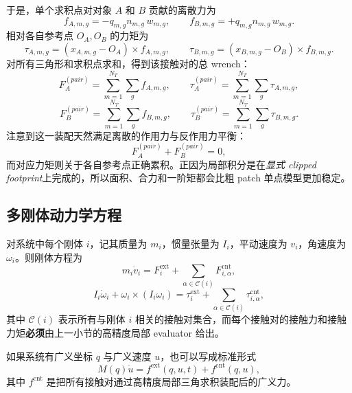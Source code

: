 \documentclass[12pt,a4paper]{ctexart}
\begin{document}
于是，单个求积点对对象 $A$ 和 $B$ 贡献的离散力为
\begin{equation}
    f_{A,m,g} = - q_{m,g} n_{m,g} \, w_{m,g},
    \qquad
    f_{B,m,g} = + q_{m,g} n_{m,g} \, w_{m,g}.
\end{equation}
相对各自参考点 $O_A,O_B$ 的力矩为
\begin{equation}
    \tau_{A,m,g} = (x_{A,m,g}-O_A)\times f_{A,m,g},
    \qquad
    \tau_{B,m,g} = (x_{B,m,g}-O_B)\times f_{B,m,g}.
\end{equation}
对所有三角形和求积点求和，得到该接触对的总 wrench：
\begin{equation}
    F_A^{(pair)} = \sum_{m=1}^{N_T}\sum_g f_{A,m,g},
    \qquad
    \tau_A^{(pair)} = \sum_{m=1}^{N_T}\sum_g \tau_{A,m,g},
\end{equation}
\begin{equation}
    F_B^{(pair)} = \sum_{m=1}^{N_T}\sum_g f_{B,m,g},
    \qquad
    \tau_B^{(pair)} = \sum_{m=1}^{N_T}\sum_g \tau_{B,m,g}.
\end{equation}
注意到这一装配天然满足离散的作用力与反作用力平衡：
\begin{equation}
    F_A^{(pair)} + F_B^{(pair)} = 0,
\end{equation}
而对应力矩则关于各自参考点正确累积。正因为局部积分是在\emph{显式 clipped footprint}上完成的，所以面积、合力和一阶矩都会比粗 patch 单点模型更加稳定。

\subsection{多刚体动力学方程}

对系统中每个刚体 $i$，记其质量为 $m_i$，惯量张量为 $I_i$，平动速度为 $v_i$，角速度为 $\omega_i$。则刚体方程为
\begin{equation}
    m_i \dot v_i = F_i^{\mathrm{ext}} + \sum_{\alpha\in\mathcal C(i)} F_{i,\alpha}^{\mathrm{cnt}},
\end{equation}
\begin{equation}
    I_i \dot \omega_i + \omega_i\times(I_i\omega_i)
    = \tau_i^{\mathrm{ext}} + \sum_{\alpha\in\mathcal C(i)} \tau_{i,\alpha}^{\mathrm{cnt}},
\end{equation}
其中 $\mathcal C(i)$ 表示所有与刚体 $i$ 相关的接触对集合，而每个接触对的接触力和接触力矩\textbf{必须}由上一小节的高精度局部 evaluator 给出。

如果系统有广义坐标 $q$ 与广义速度 $u$，也可以写成标准形式
\begin{equation}
    M(q)\dot u = f^{\mathrm{ext}}(q,u,t) + f^{\mathrm{cnt}}(q,u),
\end{equation}
其中 $f^{\mathrm{cnt}}$ 是把所有接触对通过高精度局部三角求积装配后的广义力。
\end{document}
